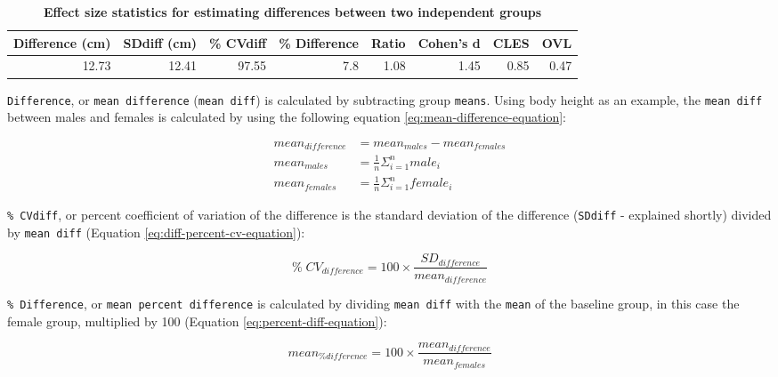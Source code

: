 \documentclass[
]{book}
\begin{document}
\begin{table}

\caption{\label{tab:effect-size-statistics-for-estimating-differences-between-two-independent-groups}\textbf{Effect size statistics for estimating differences between two independent groups}}
\centering
\begin{tabular}[t]{rrrrrrrr}
\toprule
Difference (cm) & SDdiff (cm) & \% CVdiff & \% Difference & Ratio & Cohen's d & CLES & OVL\\
\midrule
12.73 & 12.41 & 97.55 & 7.8 & 1.08 & 1.45 & 0.85 & 0.47\\
\bottomrule
\end{tabular}
\end{table}

\texttt{Difference}, or \texttt{mean\ difference} (\texttt{mean\ diff}) is calculated by subtracting group \texttt{means}. Using body height as an example, the \texttt{mean\ diff} between males and females is calculated by using the following equation \eqref{eq:mean-difference-equation}:

\begin{equation}
  \begin{split}
    mean_{difference} &= mean_{males} - mean_{females} \\
    mean_{males} &= \frac{1}{n}\Sigma_{i=1}^{n}male_i  \\
    mean_{females} &= \frac{1}{n}\Sigma_{i=1}^{n}female_i
  \end{split}
  \label{eq:mean-difference-equation}
\end{equation}

\texttt{\%\ CVdiff}, or percent coefficient of variation of the difference is the standard deviation of the difference (\texttt{SDdiff} - explained shortly) divided by \texttt{mean\ diff} (Equation \eqref{eq:diff-percent-cv-equation}):

\begin{equation}
  \%\;CV_{difference} = 100\times\frac{SD_{difference}}{mean_{difference}}
  \label{eq:diff-percent-cv-equation}
\end{equation}

\texttt{\%\ Difference}, or \texttt{mean\ percent\ difference} is calculated by dividing \texttt{mean\ diff} with the \texttt{mean} of the baseline group, in this case the female group, multiplied by 100 (Equation \eqref{eq:percent-diff-equation}):

\begin{equation}
  mean_{\% difference} = 100\times\frac{mean_{difference}}{mean_{females}}
  \label{eq:percent-diff-equation}
\end{equation}
\end{document}

